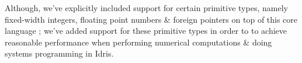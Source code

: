 Although, we've explicitly included support for certain primitive types, namely fixed-width integers, floating point numbers \& foreign pointers on top of this core language \cite{brady2013idris};
we've added support for these primitive types in order to to achieve reasonable performance when performing numerical computations \& doing systems programming in Idris.
